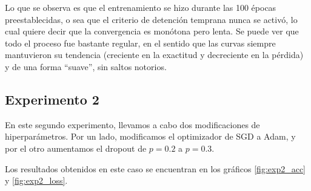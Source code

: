 \documentclass[aps,twocolumn,groupedaddress]{revtex4-2}
\begin{document}
Lo que se observa es que el entrenamiento se hizo durante las 100 épocas preestablecidas, o sea que el criterio de detención temprana nunca se activó, lo cual quiere decir que la convergencia es monótona pero lenta. Se puede ver que todo el proceso fue bastante regular, en el sentido que las curvas siempre mantuvieron su tendencia (creciente en la exactitud y decreciente en la pérdida) y de una forma ``suave'', sin saltos notorios.

\subsection{Experimento 2}
En este segundo experimento, llevamos a cabo dos modificaciones de hiperparámetros. Por un lado, modificamos el optimizador de SGD a Adam, y por el otro aumentamos el dropout de \(p=0.2\) a \(p=0.3\).

Los resultados obtenidos en este caso se encuentran en los gráficos \ref{fig:exp2_acc} y \ref{fig:exp2_loss}.
\end{document}

